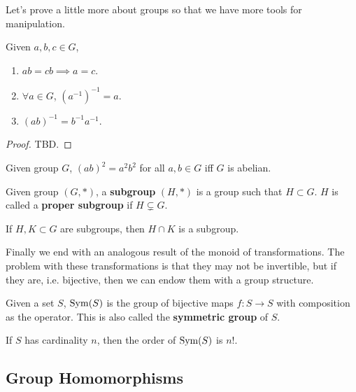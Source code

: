   Let's prove a little more about groups so that we have more tools for manipulation. 

  \begin{lemma}
    Given $a, b, c \in G$, 
    \begin{enumerate}
      \item $ab = cb \implies a = c$. 
      \item $\forall a \in G$, $(a^{-1})^{-1} = a$. 
      \item $(ab)^{-1} = b^{-1} a^{-1}$. 
    \end{enumerate}
  \end{lemma}
  \begin{proof}
    TBD. 
  \end{proof}

  \begin{theorem}
    Given group $G$, $(ab)^2 = a^2 b^2$ for all $a, b \in G$ iff $G$ is abelian. 
  \end{theorem}

  \begin{definition}[Subgroup]
    Given group $(G, \ast)$, a \textbf{subgroup} $(H, \ast)$ is a group such that $H \subset G$. $H$ is called a \textbf{proper subgroup} if $H \subsetneq G$. 
  \end{definition} 

  \begin{theorem}
    If $H, K \subset G$ are subgroups, then $H \cap K$ is a subgroup. 
  \end{theorem}

  Finally we end with an analogous result of the monoid of transformations. The problem with these transformations is that they may not be invertible, but if they are, i.e. bijective, then we can endow them with a group structure. 

  \begin{definition}
    Given a set $S$, $\Sym(S)$ is the group of bijective maps $f: S \to S$ with composition as the operator. This is also called the \textbf{symmetric group} of $S$. 
  \end{definition}

  \begin{lemma}
    If $S$ has cardinality $n$, then the order of $\Sym(S)$ is $n!$. 
  \end{lemma}

\subsection{Group Homomorphisms}

